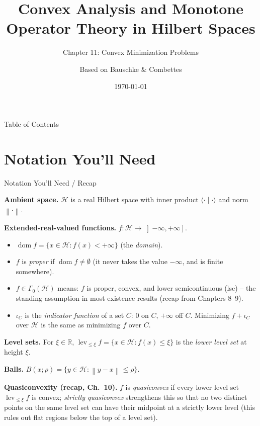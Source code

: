 \documentclass[aspectratio=169,10pt]{beamer}
\title[Convex Analysis \& MOT -- Ch.11]{Convex Analysis and Monotone Operator Theory in Hilbert Spaces}
\subtitle{Chapter 11: Convex Minimization Problems}
\author{Based on Bauschke \& Combettes}
\date{\today}
\newcommand{\mHH}{\mathcal H}
\newcommand{\inner}[2]{\langle #1 \mid #2 \rangle}
\newcommand{\norm}[1]{\left\|#1\right\|}
\newcommand{\R}{\mathbb{R}}
\newcommand{\dom}{\operatorname{dom}}
\newcommand{\lev}{\operatorname{lev}}
\newcommand{\GamZero}{\Gamma_0(\mHH)}
\newcommand{\iC}{\iota_C}
\begin{document}
\begin{frame}
  \titlepage
\end{frame}

\begin{frame}{Table of Contents}
  \tableofcontents
\end{frame}

\section{Notation You'll Need}

\begin{frame}[allowframebreaks]{Notation You'll Need / Recap}

  \textbf{Ambient space.} $\mHH$ is a real Hilbert space with inner
  product $\inner{\cdot}{\cdot}$ and norm $\norm{\cdot}$.

  \textbf{Extended-real-valued functions.} $f:\mHH\to\left]-\infty,+\infty\right]$.
  \begin{itemize}
    \item $\dom f=\{x\in\mHH: f(x)<+\infty\}$ (the \emph{domain}).
    \item $f$ is \emph{proper} if $\dom f\neq\emptyset$ (it never
          takes the value $-\infty$, and is finite somewhere).
    \item $f\in\GamZero$ means: $f$ is proper, convex, and lower
          semicontinuous (lsc) -- the standing assumption in most
          existence results (recap from Chapters 8--9).
    \item $\iC$ is the \emph{indicator function} of a set $C$: $0$ on
          $C$, $+\infty$ off $C$. Minimizing $f+\iC$ over $\mHH$ is
          the same as minimizing $f$ over $C$.
  \end{itemize}

  \textbf{Level sets.} For $\xi\in\R$,
  $\lev_{\le\xi}f=\{x\in\mHH: f(x)\le\xi\}$ is the \emph{lower level
  set} at height $\xi$.

  \textbf{Balls.} $B(x;\rho)=\{y\in\mHH:\norm{y-x}\le\rho\}$.

  \textbf{Quasiconvexity (recap, Ch.\ 10).} $f$ is \emph{quasiconvex}
  if every lower level set $\lev_{\le\xi}f$ is convex; \emph{strictly
  quasiconvex} strengthens this so that no two distinct points on the
  same level set can have their midpoint at a strictly lower level
  (this rules out flat regions below the top of a level set).


\end{frame}
\end{document}
